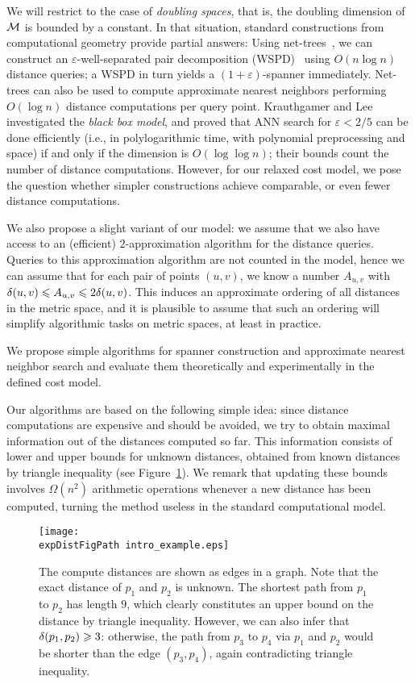 \documentclass[]{ws-ijcga}
\renewcommand{\leq}{\leqslant}
\renewcommand{\geq}{\geqslant}
\newcommand{\eps}{\varepsilon}
\def \expDistFigPath {pics/}
\begin{document}
We will restrict to the case of \emph{doubling spaces}, that is, the doubling dimension
of $\mathcal{M}$ is bounded by a constant. 
In that situation, standard constructions from computational geometry provide partial answers:
Using net-trees~\cite{hm-fast}, we can construct an $\eps$-well-separated pair decomposition (WSPD)~\cite{CK-decomposition} using $O(n\log n)$ distance queries; a WSPD in turn yields
a {$(1+\eps)$-spanner} immediately. Net-trees can also be used to compute approximate nearest neighbors
performing $O(\log n)$ distance computations per query point.
Krauthgamer and Lee \cite{krauthgamer2005black} investigated the \textit{black box model},
and proved that ANN search for $\eps < 2/5$ can be done efficiently (i.e., in polylogarithmic time, with polynomial preprocessing
and space) if and only if the dimension is $O(\log \log n)$; their bounds count the number of distance computations.
However, for our relaxed cost model, we pose the question whether simpler constructions achieve
comparable, or even fewer distance computations.

We also propose a slight variant of our model: we assume that we also have access to an (efficient)
$2$-approximation algorithm for the distance queries. Queries to this approximation algorithm
are not counted in the model, hence we can assume that for each pair of points $(u,v)$, we
know a number $A_{u,v}$ with $\dist(u,v)\leq A_{u,v}\leq 2\dist(u,v)$. This induces an approximate ordering
of all distances in the metric space, and it is plausible to assume that such an ordering will simplify
algorithmic tasks on metric spaces, at least in practice.

%
We propose simple algorithms for spanner construction and approximate nearest neighbor search
and evaluate them theoretically and experimentally in the defined cost model.

Our algorithms are based on the following simple idea: since distance computations are expensive
and should be avoided, we try to obtain maximal information out of the distances computed
so far. 
This information consists of lower and upper bounds for unknown distances, obtained from known distances
by triangle inequality (see Figure~\ref{fig:1st_example}). We remark that updating these bounds involves $\Omega(n^2)$ arithmetic
operations whenever a new distance has been computed, turning the method useless in the standard computational model.

\begin{figure}[h]
\centering
\texttt{[image: \\expDistFigPath  intro\_example.eps]}
\caption{The compute distances are shown as edges in a graph. Note that the exact distance
of $p_1$ and $p_2$ is unknown. The shortest path from $p_1$ to $p_2$ has length $9$, which clearly
constitutes an upper bound on the distance by triangle inequality.
However, we can also infer that $\dist(p_1,p_2)\geq 3$:
otherwise, the path from $p_3$ to $p_4$ via $p_1$ and $p_2$
would be shorter than the edge $(p_3,p_4)$, again contradicting
triangle inequality.}
\label{fig:1st_example}
\end{figure}
\end{document}
